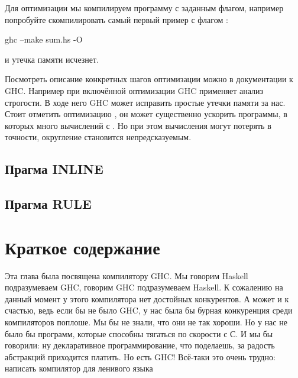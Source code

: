 Для оптимизации мы компилируем программу с заданным флагом,
например попробуйте скомпилировать самый первый пример
с флагом :

\begin{code}
ghc --make sum.hs -O 
\end{code}
  
\noindent и утечка памяти исчезнет.

Посмотреть описание конкретных шагов оптимизации можно
в документации к GHC. Например при включённой оптимизации 
GHC применяет анализ строгости. В ходе него GHC может
исправить простые утечки памяти за нас. Стоит отметить
оптимизацию , он может существенно
ускорить программы, в которых много вычислений с .
Но при этом вычисления могут потерять в точности, 
округление становится непредсказуемым.

\subsection{Прагма INLINE}
\subsection{Прагма RULE}

\begin{code}
\end{code}
  

\begin{code}
\end{code}
  




\begin{code}
\end{code}

\begin{code}
\end{code}
  

\section{Краткое содержание}

Эта глава была посвящена компилятору GHC. Мы говорим Haskell
подразумеваем GHC, говорим GHC подразумеваем Haskell. 
К сожалению на данный момент у этого компилятора нет достойных
конкурентов. А может и к счастью, ведь если бы не было
GHC, у нас была бы бурная конкуренция среди компиляторов 
поплоше. Мы бы не знали, что они не так хороши. 
Но у нас не было бы программ, которые способны тягаться 
по скорости с С. И мы бы говорили: ну декларативное 
программирование, что поделаешь, за радость абстракций 
приходится платить. Но есть GHC! Всё-таки это очень
трудно: написать компилятор для ленивого языка

